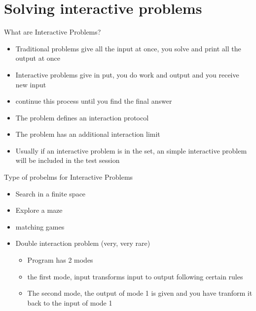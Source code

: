 \documentclass[11pt,pdf, aspectratio=169]{beamer}
\begin{document}
  \section{Solving interactive problems}
  \begin{frame}{What are Interactive Problems?}
    \begin{itemize}
      \item Traditional problems give all the input at once, you solve and print all the output at once
      \item Interactive problems give in put, you do work and output and you receive new input
      \item continue this process until you find the final answer
      \item The problem defines an interaction protocol
      \item The problem has an additional interaction limit
      \item Usually if an interactive problem is in the set, an simple interactive problem will be included in the test session
    \end{itemize}
  \end{frame}
  \begin{frame}{Type of probelms for Interactive Problems}
    \begin{itemize}
      \item Search in a finite space
      \item Explore a maze
      \item matching games
      \item Double interaction problem (very, very rare)
      \begin{itemize}
        \item Program has 2 modes
        \item the first mode, input transforms input to output following certain rules
        \item The second mode, the output of mode 1 is given and you have tranform it back to the input of mode 1
      \end{itemize}
    \end{itemize}
  \end{frame}
\end{document}
